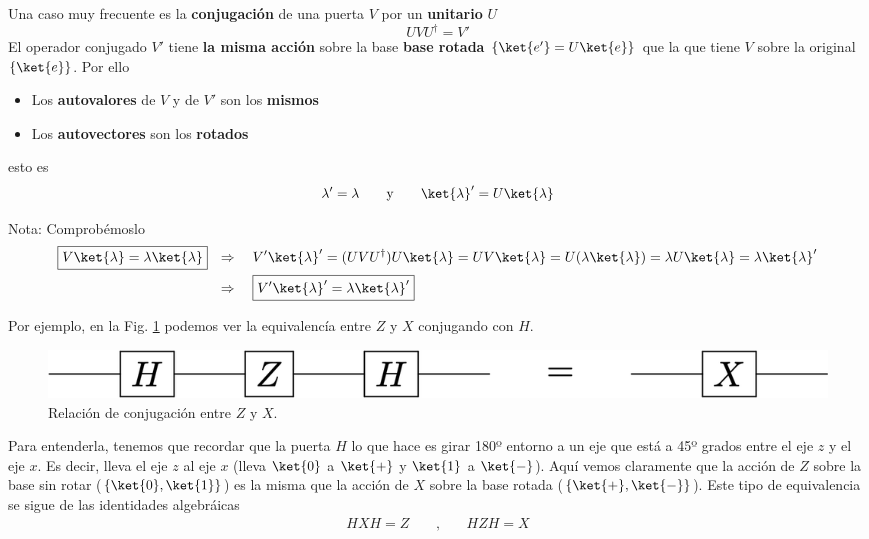 \documentclass[a4paper,11pt]{book} %
\numberwithin{equation}{chapter}
\def\lch{\left\{}
\def\rch{\right\}}
\begin{document}
Una caso muy frecuente es la \textbf{conjugación} de una puerta $V$  por un \textbf{unitario} $U$
	\begin{equation}
	U V   U^\dagger = V'  
	\end{equation}
El operador conjugado $V'$ tiene \textbf{la misma acción} sobre la base \textbf{base rotada} $\{\ket{e'} = U\ket{e}\}$ que la que tiene $V$ sobre la original $\{\ket{e}\}$. Por ello
\begin{itemize}
	\item Los \textbf{autovalores} de $V$ y de $V'$ son los \textbf{mismos}
	\item Los \textbf{autovectores} son los \textbf{rotados}
\end{itemize}
esto es
\begin{equation}
\lambda' = \lambda ~~~~~~\hbox{y}~~~~~~  \ket{\lambda}' = U\ket{\lambda}
\end{equation}

	\begin{mybox_blue}{Nota: Comprobémoslo}
	\begin{align*}
	\boxed{V \ket{\lambda}= \lambda\ket{\lambda}} & ~~ \Rightarrow ~~~V'\ket{\lambda}' =
	 (UVU^\dagger) U\ket{\lambda} = UV\ket{\lambda} =  U(\lambda\ket{\lambda}) = 
	 \lambda U\ket{\lambda} = \lambda\ket{\lambda}' \\ 
	 & ~~\Rightarrow ~~~ \boxed{ V' \ket{\lambda}' 
	 = \lambda\ket{\lambda}'}
	\end{align*}
	\end{mybox_blue}

Por ejemplo, en la Fig. \ref{Fig_elementos_H_conjugation} podemos ver la equivalencía entre $Z$ y $X$ conjugando con $H$. 
	\begin{figure}[H]
	\centering 
	\includegraphics[width=0.5\linewidth]{Figuras/Fig_elementos_H_conjugation}
	\caption{Relación de conjugación entre $Z$ y $X$.}
	\label{Fig_elementos_H_conjugation}
	\end{figure}
Para entenderla, tenemos que recordar que  la puerta $H$ lo que hace es girar 180º entorno a un eje que está a 45º grados entre el eje $z$ y el eje $x$. Es decir, lleva el eje $z$ al eje $x$ (lleva $\ket{0}$ a $\ket{+}$ y $\ket{1}$ a $\ket{-}$). Aquí vemos claramente que la acción de $Z$ sobre la base sin rotar ($\lch \ket{0}, \ket{1} \rch$) es la misma que la acción de $X$ sobre la base rotada ($\lch \ket{+},\ket{-} \rch $). Este tipo de equivalencia se sigue de las identidades algebráicas
\begin{eqnarray}
HXH = Z ~~~~~&,&~~ ~~~
HZH = X \nonumber
\end{eqnarray}
\end{document}
